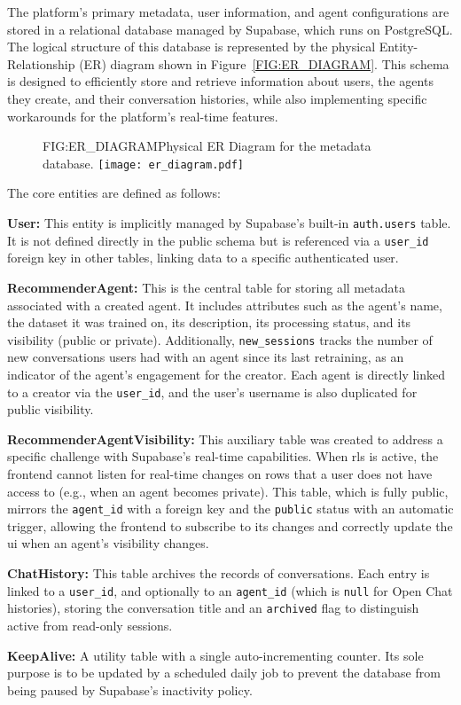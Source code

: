 The platform's primary metadata, user information, and agent configurations are stored in a relational database managed by Supabase, which runs on PostgreSQL. The logical structure of this database is represented by the physical Entity-Relationship (ER) diagram shown in Figure~\ref{FIG:ER_DIAGRAM}. This schema is designed to efficiently store and retrieve information about users, the agents they create, and their conversation histories, while also implementing specific workarounds for the platform's real-time features.

\begin{figure}[Physical ER Diagram]{FIG:ER_DIAGRAM}{Physical ER Diagram for the metadata database.}
    \texttt{[image: er\_diagram.pdf]}
\end{figure}

The core entities are defined as follows:
\begin{compactitem}[\textbullet]
    \item \textbf{User:} This entity is implicitly managed by Supabase's built-in \texttt{auth.users} table. It is not defined directly in the public schema but is referenced via a \texttt{user\_id} foreign key in other tables, linking data to a specific authenticated user.
    \item \textbf{RecommenderAgent:} This is the central table for storing all metadata associated with a created agent. It includes attributes such as the agent's name, the dataset it was trained on, its description, its processing status, and its visibility (public or private). Additionally, \texttt{new\_sessions} tracks the number of new conversations users had with an agent since its last retraining, as an indicator of the agent's engagement for the creator. Each agent is directly linked to a creator via the \texttt{user\_id}, and the user's username is also duplicated for public visibility.
    \item \textbf{RecommenderAgentVisibility:} This auxiliary table was created to address a specific challenge with Supabase's real-time capabilities. When \acl{rls} is active, the frontend cannot listen for real-time changes on rows that a user does not have access to (e.g., when an agent becomes private). This table, which is fully public, mirrors the \texttt{agent\_id} with a foreign key and the \texttt{public} status with an automatic trigger, allowing the frontend to subscribe to its changes and correctly update the \acs{ui} when an agent's visibility changes.
    \item \textbf{ChatHistory:} This table archives the records of conversations. Each entry is linked to a \texttt{user\_id}, and optionally to an \texttt{agent\_id} (which is \texttt{null} for Open Chat histories), storing the conversation title and an \texttt{archived} flag to distinguish active from read-only sessions.
    \item \textbf{KeepAlive:} A utility table with a single auto-incrementing counter. Its sole purpose is to be updated by a scheduled daily job to prevent the database from being paused by Supabase's inactivity policy.
\end{compactitem}
